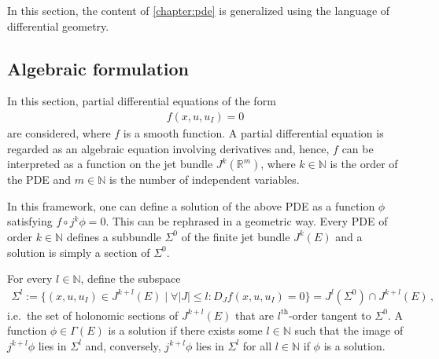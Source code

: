     In this section, the content of \cref{chapter:pde} is generalized using the language of differential geometry.

\subsection{Algebraic formulation}

    In this section, partial differential equations of the form
    \begin{gather}
        \label{var:pde_jet}
        f(x,u,u_I) = 0
    \end{gather}
    are considered, where $f$ is a smooth function. A partial differential equation is regarded as an algebraic equation involving derivatives and, hence, $f$ can be interpreted as a function on the jet bundle $J^k(\mathbb{R}^m)$, where $k\in\mathbb{N}$ is the order of the PDE and $m\in\mathbb{N}$ is the number of independent variables.

    In this framework, one can define a solution of the above PDE as a function $\phi$ satisfying $f\circ j^k\phi=0$. This can be rephrased in a geometric way. Every PDE of order $k\in\mathbb{N}$ defines a subbundle $\Sigma^0$ of the finite jet bundle $J^k(E)$ and a solution is simply a section of $\Sigma^0$.

    \begin{remark}
        For every $l\in\mathbb{N}$, define the subspace
        \begin{gather}
            \Sigma^l:=\{(x,u,u_I)\in J^{k+l}(E)\mid\forall|J|\leq l:D_Jf(x,u,u_I)= 0\} = J^l(\Sigma^0)\cap J^{k+l}(E)\,,
        \end{gather}
        i.e.~the set of holonomic sections of $J^{k+l}(E)$ that are $l^{\text{th}}$-order tangent to $\Sigma^0$. A function $\phi\in\Gamma(E)$ is a solution if there exists some $l\in\mathbb{N}$ such that the image of $j^{k+l}\phi$ lies in $\Sigma^l$ and, conversely, $j^{k+l}\phi$ lies in $\Sigma^l$ for all $l\in\mathbb{N}$ if $\phi$ is a solution.
    \end{remark}


